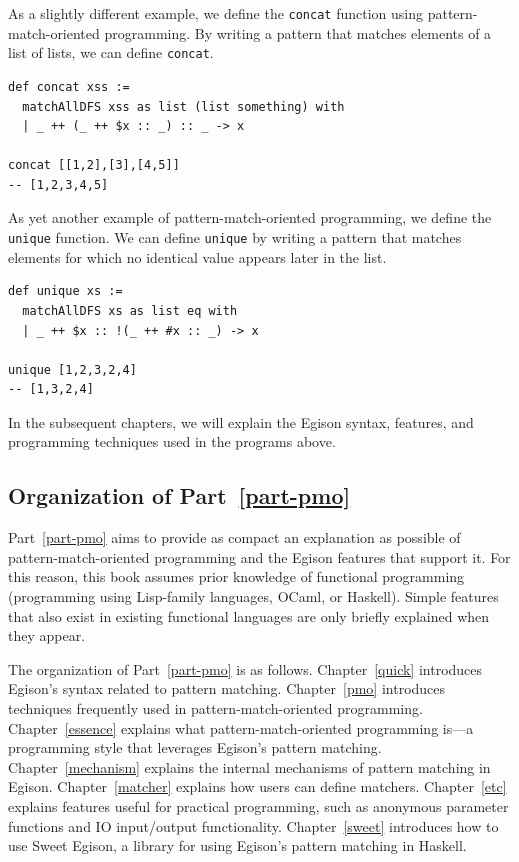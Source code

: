 As a slightly different example, we define the \lstinline{concat} function using pattern-match-oriented programming.
By writing a pattern that matches elements of a list of lists, we can define \lstinline{concat}.

\begin{lstlisting}[language=egison,numbers=none]
def concat xss :=
  matchAllDFS xss as list (list something) with
  | _ ++ (_ ++ $x :: _) :: _ -> x

concat [[1,2],[3],[4,5]]
-- [1,2,3,4,5]
\end{lstlisting}

As yet another example of pattern-match-oriented programming, we define the \lstinline{unique} function.
We can define \lstinline{unique} by writing a pattern that matches elements for which no identical value appears later in the list.
\begin{lstlisting}[language=egison,numbers=none]
def unique xs :=
  matchAllDFS xs as list eq with
  | _ ++ $x :: !(_ ++ #x :: _) -> x

unique [1,2,3,2,4]
-- [1,3,2,4]  
\end{lstlisting}
In the subsequent chapters, we will explain the Egison syntax, features, and programming techniques used in the programs above.

\subsection{Organization of Part~\ref{part-pmo}}

Part~\ref{part-pmo} aims to provide as compact an explanation as possible of pattern-match-oriented programming and the Egison features that support it.
For this reason, this book assumes prior knowledge of functional programming (programming using Lisp-family languages, OCaml, or Haskell).
Simple features that also exist in existing functional languages are only briefly explained when they appear.

The organization of Part~\ref{part-pmo} is as follows.
Chapter~\ref{quick} introduces Egison's syntax related to pattern matching.
Chapter~\ref{pmo} introduces techniques frequently used in pattern-match-oriented programming.
Chapter~\ref{essence} explains what pattern-match-oriented programming is---a programming style that leverages Egison's pattern matching.
Chapter~\ref{mechanism} explains the internal mechanisms of pattern matching in Egison.
Chapter~\ref{matcher} explains how users can define matchers.
Chapter~\ref{etc} explains features useful for practical programming, such as anonymous parameter functions and IO input/output functionality.
Chapter~\ref{sweet} introduces how to use Sweet Egison, a library for using Egison's pattern matching in Haskell.

